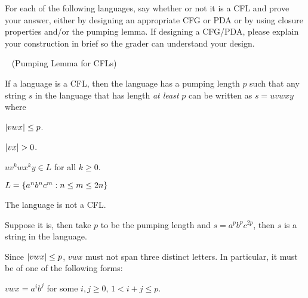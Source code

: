 \begin{problem}
  For each of the following languages, say whether or not it is a CFL
  and prove your answer, either by designing an appropriate CFG or PDA
  or by using closure properties and/or the pumping lemma.
  If designing a CFG/PDA, please explain your construction in brief
  so the grader can understand your design.

  \bigskip
  \begin{blockcolor}
    \begin{lemma}~\label{lemma:pl} (Pumping Lemma for CFLs)

      \step
      If a language is a CFL, then the language
      has a pumping length $p$ such that any string $s$ in the language
      that has length \emph{at least} $p$ can be written
      as $s = uvwxy$ where
      \begin{enumroman}
        \item $\lvert vwx\rvert \leq p$.
        \item $\lvert vx\rvert > 0$.
        \item $uv^kwx^ky \in L$ for all $k \geq 0$.
      \end{enumroman}
    \end{lemma}
  \end{blockcolor}

  \begin{enumalph}
    \newpage
    \item $L = \left\{a^nb^nc^m : n \le m \le 2n\right\}$
    \begin{Answer}
      The language is not a CFL.

      \step
      Suppose it is, then take $p$ to be the pumping length
      and $s = a^pb^pc^{2p}$, then $s$ is a string in the language.
      
      Since $\lvert vwx\rvert \leq p$, $vwx$ must not span three distinct letters.
      In particular, it must be of one of the following forms:
      \begin{enumroman}
        \item $vwx = a^ib^j$ for some $i, j \geq 0$, $1 < i + j \leq p$.


\end{enumroman}
\end{Answer}
\end{enumalph}
\end{problem}
